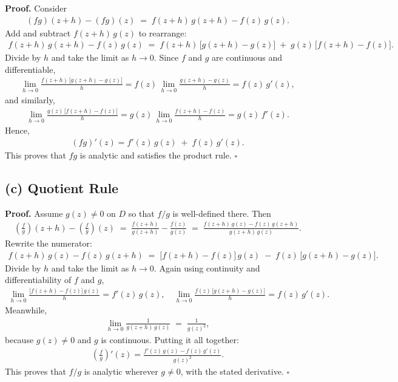 \documentclass[12pt]{article}
\theoremstyle{definition} %
\theoremstyle{plain} %
\begin{document}
\textbf{Proof.}
Consider
\begin{align}
(fg)(z + h) - (fg)(z) 
\;=\;
f(z + h)\,g(z + h) - f(z)\,g(z).
\end{align}
Add and subtract $f(z+h)\,g(z)$ to rearrange:
\begin{align}
f(z + h)\,g(z + h)
- f(z)\,g(z)
\;=\;
f(z + h)\,\bigl[g(z + h) - g(z)\bigr]
\;+\;
g(z)\,\bigl[f(z + h) - f(z)\bigr].
\end{align}
Divide by $h$ and take the limit as $h \to 0$. Since $f$ and $g$ are continuous and differentiable,
\begin{align}
\lim_{h \to 0} \frac{f(z + h)\,\bigl[g(z + h) - g(z)\bigr]}{h}
=
f(z)\,\lim_{h \to 0}\frac{g(z + h) - g(z)}{h}
=
f(z)\,g'(z),
\end{align}
and similarly,
\begin{align}
\lim_{h \to 0} \frac{g(z)\,\bigl[f(z + h) - f(z)\bigr]}{h}
=
g(z)\,\lim_{h \to 0}\frac{f(z + h) - f(z)}{h}
=
g(z)\,f'(z).
\end{align}
Hence,
\begin{align}
(fg)'(z) = f'(z)\,g(z) \;+\; f(z)\,g'(z).
\end{align}
This proves that $fg$ is analytic and satisfies the product rule.
\quad $\square$

\subsection*{(c) Quotient Rule}

\textbf{Proof.}
Assume $g(z) \neq 0$ on $D$ so that $f/g$ is well-defined there. Then
\begin{align}
\left(\frac{f}{g}\right)(z + h) - \left(\frac{f}{g}\right)(z)
\;=\;
\frac{f(z + h)}{g(z + h)} - \frac{f(z)}{g(z)}
\;=\;
\frac{f(z + h)\,g(z) - f(z)\,g(z + h)}{g(z + h)\,g(z)}.
\end{align}
Rewrite the numerator:
\begin{align}
f(z + h)\,g(z) - f(z)\,g(z + h)
\;=\;
\bigl[f(z + h) - f(z)\bigr]\,g(z)
\;-\;
f(z)\,\bigl[g(z + h) - g(z)\bigr].
\end{align}
Divide by $h$ and take the limit as $h \to 0$. Again using continuity and differentiability of $f$ and $g$,
\begin{align}
\lim_{h \to 0} 
\frac{\bigl[f(z + h) - f(z)\bigr]\,g(z)}{h}
=
f'(z)\,g(z),
\quad
\lim_{h \to 0}
\frac{f(z)\,\bigl[g(z + h) - g(z)\bigr]}{h}
=
f(z)\,g'(z).
\end{align}
Meanwhile,
\begin{align}
\lim_{h \to 0} \frac{1}{g(z + h)\,g(z)} 
\;=\;
\frac{1}{g(z)^2},
\end{align}
because $g(z)\neq 0$ and $g$ is continuous. Putting it all together:
\begin{align}
\left(\frac{f}{g}\right)'(z)
=
\frac{f'(z)\,g(z) - f(z)\,g'(z)}{g(z)^2}.
\end{align}
This proves that $f/g$ is analytic wherever $g \neq 0$, with the stated derivative.
\quad $\square$
\end{document}
